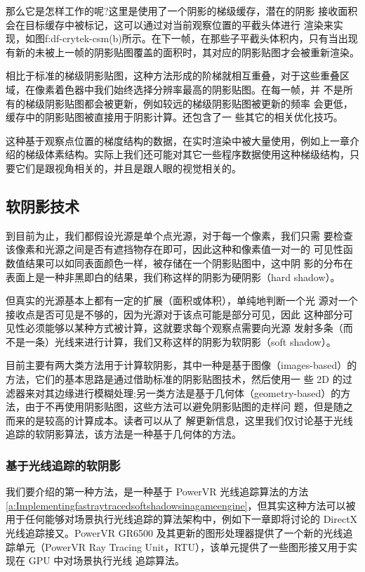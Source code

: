 那么它是怎样工作的呢?这里是使用了一个阴影的梯级缓存，潜在的阴影 接收面积会在目标缓存中被标记，这可以通过对当前观察位置的平截头体进行 渲染来实现，如图{f:df-crytek-csm}(b)所示。在下一帧，在那些子平截头体积内，只有当出现有新的未被上一帧的阴影贴图覆盖的面积时，其对应的阴影贴图才会被重新渲染。

相比于标准的梯级阴影贴图，这种方法形成的阶梯就相互重叠，对于这些重叠区域，在像素着色器中我们始终选择分辨率最高的阴影贴图。在每一帧，并 不是所有的梯级阴影贴图都会被更新，例如较远的梯级阴影贴图被更新的频率 会更低，缓存中的阴影贴图被直接用于阴影计算。\cite{a:PlayingwithReal-TimeShadows}还包含了一 些其它的相关优化技巧。

这种基于观察点位置的梯度结构的数据，在实时渲染中被大量使用，例如上一章介绍的梯级体素结构。实际上我们还可能对其它一些程序数据使用这种梯级结构，只要它们是跟视角相关的，并且是跟人眼的视觉相关的。


\subsection{软阴影技术}\label{sec:df-soft-shadow}
到目前为止，我们都假设光源是单个点光源，对于每一个像素，我们只需 要检查该像素和光源之间是否有遮挡物存在即可，因此这种和像素值一对一的 可见性函数值结果可以如同表面颜色一样，被存储在一个阴影贴图中，这中阴 影的分布在表面上是一种非黑即白的结果，我们称这样的阴影为硬阴影（hard shadow）。

但真实的光源基本上都有一定的扩展（面积或体积），单纯地判断一个光 源对一个接收点是否可见是不够的，因为光源对于该点可能是部分可见，因此 这种部分可见性必须能够以某种方式被计算，这就要求每个观察点需要向光源 发射多条（而不是一条）光线来进行计算，我们又称这样的阴影为软阴影（soft shadow）。

目前主要有两大类方法用于计算软阴影，其中一种是基于图像（images-based）的方法，它们的基本思路是通过借助标准的阴影贴图技术，然后使用一 些 2D 的过滤器来对其边缘进行模糊处理;另一类方法是基于几何体（geometry-based）的方法，由于不再使用阴影贴图，这些方法可以避免阴影贴图的走样问 题，但是随之而来的是较高的计算成本。读者可以从\cite{b:rts}了 解更新信息，这里我们仅讨论基于光线追踪的软阴影算法，该方法是一种基于几何体的方法。




\subsubsection{基于光线追踪的软阴影}
我们要介绍的第一种方法，是一种基于 PowerVR 光线追踪算法的方法 \ref{a:Implementingfastraytracedsoftshadowsinagameengine}，但其实这种方法可以被用于任何能够对场景执行光线追踪的算法架构中，例如下一章即将讨论的 DirectX 光线追踪接又。PowerVR GR6500 及其更新的图形处理器提供了一个新的光线追踪单元（PowerVR Ray Tracing Unit，RTU），该单元提供了一些图形接又用于实现在 GPU 中对场景执行光线 追踪算法。

